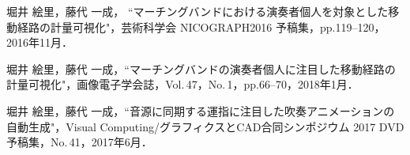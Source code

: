 \renewcommand{\refname}{公開文献}	
%
\begin{thebibliography}{55}
%
堀井 絵里，藤代 一成，
``マーチングバンドにおける演奏者個人を対象とした移動経路の計量可視化"，芸術科学会 NICOGRAPH2016 予稿集，pp.119--120，2016年11月．

堀井 絵里，藤代 一成，``マーチングバンドの演奏者個人に注目した移動経路の計量可視化"，画像電子学会誌，Vol.\,47，No.\,1，pp.66--70，2018年1月．

堀井 絵里，藤代 一成，``音源に同期する運指に注目した吹奏アニメーションの自動生成"，Visual Computing/グラフィクスとCAD合同シンポジウム 2017 DVD 予稿集，No.\,41，2017年6月．

\end{thebibliography}